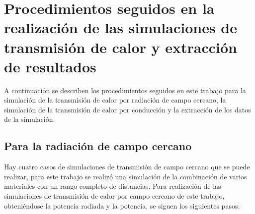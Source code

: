 \section{Procedimientos seguidos en la realización de las simulaciones de transmisión de calor y extracción de resultados}
A continuación se describen los procedimientos seguidos en este trabajo para la simulación de la transmisión de calor por radiación de campo cercano, la simulación de la transmisión de calor por conducción y la extracción de los datos de la simulación.\\
\subsection{Para la radiación de campo cercano}
Hay cuatro casos de simulaciones de transmisión de campo cercano que se puede realizar, para este trabajo se realizó una simulación de la combinación de varios materiales con un rango completo de distancias. Para realización de las simulaciones de transmisión de calor por campo cercano de este trabajo, obteniéndose la potencia radiada y la potencia, se siguen los siguientes pasos:
